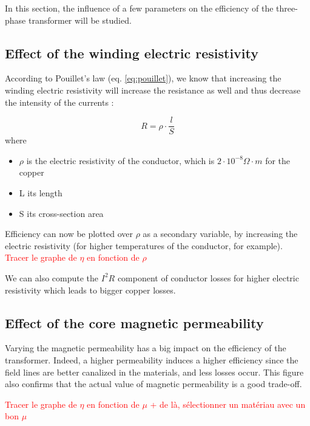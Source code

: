\documentclass[12pt,a4paper]{report}
\begin{document}
In this section, the influence of a few parameters on the efficiency of the three-phase transformer will be studied.

\subsection{Effect of the winding electric resistivity}
According to Pouillet's law (eq. \ref{eq:pouillet}), we know that increasing the winding electric resistivity will increase the resistance as well and thus decrease the intensity of the currents :

\begin{equation}
    R = \rho \cdot \frac{l}{S}
    \label{eq:pouillet}
\end{equation}
where 
\begin{itemize}
    \item $\rho$ is the electric resistivity of the conductor, which is $2 \cdot 10^{-8} \Omega \cdot m$ for the copper
    \item L its length 
    \item S its cross-section area
\end{itemize}

Efficiency can now be plotted over $\rho$ as a secondary variable, by increasing the electric resistivity (for higher temperatures of the conductor, for example).\\

\textcolor{red}{Tracer le graphe de $\eta$ en fonction de $\rho$}

We can also compute the $I^2R$ component of conductor losses for higher electric resistivity which leads to bigger copper losses.

\subsection{Effect of the core magnetic permeability}
Varying the magnetic permeability has a big impact on the efficiency of the transformer. Indeed, a higher permeability induces a higher efficiency since the field lines are better canalized in the materials, and less losses occur. This figure also confirms that the actual value of magnetic permeability is a good trade-off.

\textcolor{red}{Tracer le graphe de $\eta$ en fonction de $\mu$ + de là, sélectionner un matériau avec un bon $\mu$}
\end{document}
